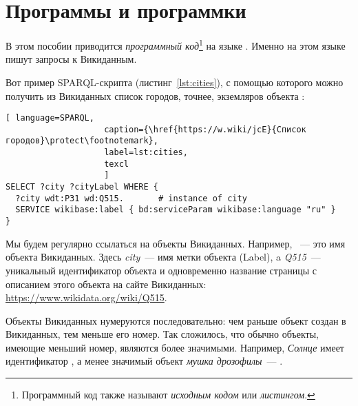 

\chapter{Программы и программки}
\label{ch:listing_about}

В этом пособии приводится \emph{программный код}\footnote[][0cm]{%
    Программный код также называют  \emph{исходным кодом} или 
    \emph{листингом}.
%   
} на языке . 
Именно на этом языке пишут запросы к Викиданным.


Вот пример SPARQL-скрипта (листинг~\ref{lst:cities}), 
с помощью которого можно получить из Викиданных список городов, 
точнее, экземляров объекта
:

\begin{lstlisting}[ language=SPARQL, 
                    caption={\href{https://w.wiki/jcE}{Список городов}\protect\footnotemark},
                    label=lst:cities,
                    texcl 
                    ]
SELECT ?city ?cityLabel WHERE { 
  ?city wdt:P31 wd:Q515.       # instance of city
  SERVICE wikibase:label { bd:serviceParam wikibase:language "ru" }
}
\end{lstlisting}%

Мы будем регулярно ссылаться на объекты Викиданных. 
Например, ~--- это имя объекта Викиданных. 
Здесь \emph{city}~--- имя метки объекта (Label), 
a \emph{Q515}~--- уникальный идентификатор объекта 
и одновременно название страницы с описанием этого объекта на сайте Викиданных: \href{https://www.wikidata.org/wiki/Q515}{https://www.wikidata.org/wiki/Q515}.

\label{WDObjectsNumbering}
Объекты Викиданных нумеруются последовательно: чем раньше 
объект создан в Викиданных, тем меньше его номер. 
Так сложилось, что обычно объекты, имеющие меньший номер, являются более значимыми. 
Например, \emph{Солнце} имеет идентификатор , а менее значимый объект \emph{мушка дрозофилы}~--- .
